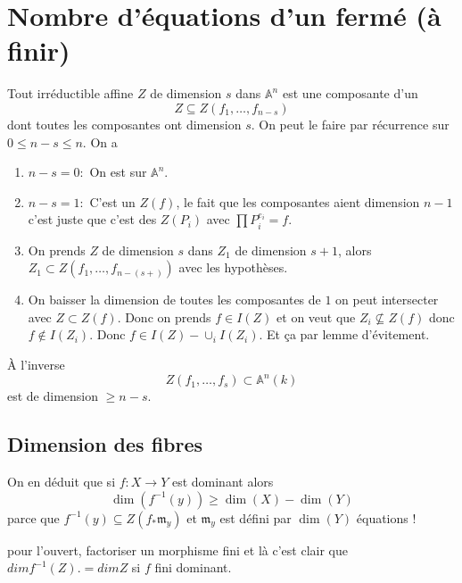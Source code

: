 \documentclass[a4paper,12pt]{book}
\newcommand{\A}{\mathbb{A}}
\newcommand{\m}{\mathfrak{m}}
\theoremstyle{plain}
\theoremstyle{definition}
\theoremstyle{remark}
\begin{document}
\section{Nombre d'équations d'un fermé (à finir)}
Tout irréductible affine $Z$ de dimension $s$ dans $\A^n$ est une 
composante d'un
\[Z\subseteq Z(f_1,\ldots, f_{n-s})\]
dont toutes les composantes ont dimension $s$. On peut le faire
par récurrence sur $0\leq n-s\leq n$. On a 
\begin{enumerate}
    \item $n-s=0 :$ On est sur $\A^n$.
    \item $n-s=1 :$ C'est un $Z(f)$, le fait que les composantes
	aient dimension $n-1$ c'est juste que c'est des 
	$Z(P_i)$ avec $\prod P_i^{e_i}=f$.
    \item On prends $Z$ de dimension $s$ dans $Z_1$ de dimension
	$s+1$, alors $Z_1\subset Z(f_1,\ldots, f_{n-(s+)})$ avec
	les hypothèses.
    \item On baisser la dimension de toutes les composantes de $1$
	on peut intersecter avec $Z\subset Z(f)$. Donc on prends
	$f\in I(Z)$ et on veut que $Z_i\nsubseteq Z(f)$ donc 
	$f\notin I(Z_i)$. Donc $f\in I(Z)-\cup_i I(Z_i)$. Et ça
	par lemme d'évitement.
\end{enumerate}

À l'inverse
\[Z(f_1,\ldots, f_{s})\subset \A^n(k)\]
est de dimension $\geq n-s$.
\subsection{Dimension des fibres}
On en déduit que si $f\colon X\to Y$ est dominant alors
\[\dim(f^{-1}(y))\geq \dim(X)-\dim(Y)\]
parce que $f^{-1}(y)\subseteq Z(f_*\m_y)$ et $\m_y$ est défini
par $\dim(Y)$ équations ! 

pour l'ouvert, factoriser un morphisme fini et là c'est clair
que $dim f^{-1}(Z).= dim Z$ si $f$ fini dominant.

\printbibliography
\end{document}
